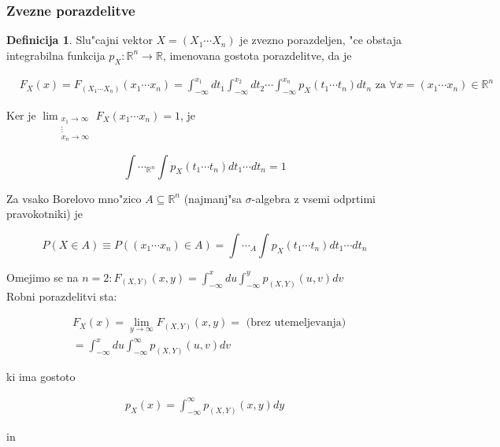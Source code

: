 \documentclass[a4paper,12pt]{article}
\theoremstyle{definition}
\newtheorem{defn}[counter]{Definicija}
\theoremstyle{remark}
\newcommand{\R}{\mathbb{R}}
\begin{document}
\subsubsection{Zvezne porazdelitve}

\begin{defn}
    Slu"cajni vektor $X = (X_1 \cdots X_n)$ je zvezno porazdeljen, "ce obstaja integrabilna funkcija $p_X: \R^n \to \R$,
    imenovana gostota porazdelitve, da je

    \begin{align*}
        &F_X(x) = F_{(X_1 \cdots X_n)}(x_1 \cdots x_n) = \int_{-\infty}^{x_1} dt_1 \int_{-\infty}^{x_2} dt_2 \cdots
            \int_{-\infty}^{x_n} p_X(t_1 \cdots t_n) dt_n \text{ za } \forall x = (x_1 \cdots x_n) \in \R^n
    \end{align*}
\end{defn}

Ker je $\lim_{\substack{x_1 \to \infty \\ \vdots \\ x_n \to \infty}} F_X(x_1 \cdots x_n) = 1$, je

\begin{equation*}
    \int \cdots_{\R^n} \int p_X(t_1 \cdots t_n) dt_1 \cdots dt_n = 1
\end{equation*}

Za vsako Borelovo mno"zico $A \subseteq \R^n$ (najmanj"sa $\sigma$-algebra z vsemi odprtimi pravokotniki) je

\begin{equation*}
    P(X \in A) \equiv P((x_1 \cdots x_n) \in A) = \int \cdots_{A} \int p_X(t_1 \cdots t_n) dt_1 \cdots dt_n
\end{equation*}

Omejimo se na $n=2: F_{(X,Y)}(x,y) = \int_{-\infty}^{x} du \int_{-\infty}^{y} p_{(X,Y)}(u,v) dv$ \\
Robni porazdelitvi sta:

\begin{align*}
    &F_X(x) = \lim_{y \to \infty} F_{(X,Y)}(x,y) = \text{ (brez utemeljevanja)} \\
    &= \int_{-\infty}^{x} du \int_{-\infty}^{\infty} p_{(X,Y)}(u,v) dv
\end{align*}

ki ima gostoto

\begin{align*}
    p_X(x) = \int_{-\infty}^{\infty} p_{(X,Y)}(x,y) dy
\end{align*}

in
\end{document}
